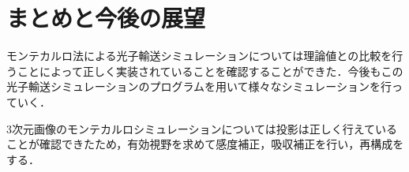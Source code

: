 \documentclass[dvipdfmx,autodetect-engine,twocolumn,10pt]{jsarticle}%
\newif\iffigure
\begin{document}
\iffigure
  \begin{figure}[htbp]
    \begin{center}
      \texttt{[image: ./file/single\_proj\_profile.png]}
      \caption{プロファイル}
      \label{single_proj_profile}
    \end{center}
  \end{figure}
\fi

\newpage
\section{まとめと今後の展望}
モンテカルロ法による光子輸送シミュレーションについては理論値との比較を行うことによって正しく実装されていることを確認することができた．今後もこの光子輸送シミュレーションのプログラムを用いて様々なシミュレーションを行っていく．

3次元画像のモンテカルロシミュレーションについては投影は正しく行えていることが確認できたため，有効視野を求めて感度補正，吸収補正を行い，再構成をする．
\end{document}
